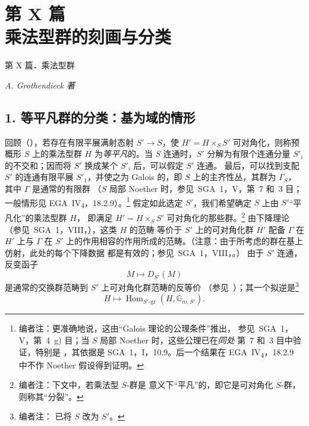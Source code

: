
\setcounter{footnote}{0}
\chapter*{第 X 篇\\
乘法型群的刻画与分类}
  {第 X 篇．乘法型群}

\begin{center}
  \textit{A. Grothendieck 著}
\end{center}
\begin{NoHyper}
\end{NoHyper}

\section*{1. 等平凡群的分类：基为域的情形}

回顾（），若存在有限平展满射态射
\(S'\to S\)，使 \(H'=H\times_S S'\) 可对角化，则称预概形 \(S\) 上的乘法型群
\(H\) 为\emph{等平凡}的。当 \(S\) 连通时，\(S'\) 分解为有限个连通分量
\(S'_i\) 的不交和；因而将 \(S'\) 换成某个 \(S'_i\) 后，可以假定 \(S'\) 连通。
最后，可以找到支配 \(S'\) 的连通有限平展 \(S'_1\)，并使之为 Galois 的，即
\(S\) 上的主齐性丛，其群为 \(\Gamma_S\)，其中 \(\Gamma\) 是通常的有限群
（\(S\) 局部 Noether 时，参见\ SGA~1，V，第~7 和~3 目；一般情形见
EGA~IV\textsubscript{4}，18.2.9）。\footnote{编者注：更准确地说，这由“Galois 理论的公理条件”推出，
参见\ SGA~1，V，第~4~g) 目；当 \(S\) 局部 Noether 时，这些公理已在\emph{同处}
第~7 和~3 目中验证，特别是 ，其依据是
SGA~1，I，10.9。后一个结果在 EGA~IV\textsubscript{4}，18.2.9 中不作 Noether 假设得到证明。}
假定如此选定 \(S'\)，我们希望确定 \(S\) 上由 \(S'\)“平凡化”的乘法型群 \(H\)，
即满足 \(H'=H\times_S S'\) 可对角化的那些群。\footnote{编者注：下文中，若乘法型
\(S\)-群是  意义下“平凡”的，即它是可对角化
\(S\)-群，则称其“分裂”。}
由下降理论（参见\ SGA~1，VIII，），这类 \(H\) 的范畴
等价于 \(S'\) 上的可对角化群 \(H'\) 配备 \(\Gamma\) 在 \(H'\) 上与 \(\Gamma\) 在
\(S'\) 上的作用相容的作用所成的范畴。（注意：由于所考虑的群在基上仿射，此处的每个下降数据
都是有效的；参见\ SGA~1，VIII，。）
由于 \(S'\) 连通，反变函子
\[
  M\longmapsto D_{S'}(M)
\]
是通常的交换群范畴到 \(S'\) 上可对角化群范畴的反等价
（参见\ ）；其一个拟逆是\footnote{编者注：
已将 \(S\) 改为 \(S'\)。}
\[
  H\longmapsto
  \operatorname{Hom}_{S'\text{-}\mathrm{gr}}(H,\mathbb G_{m,S'}).
\]

